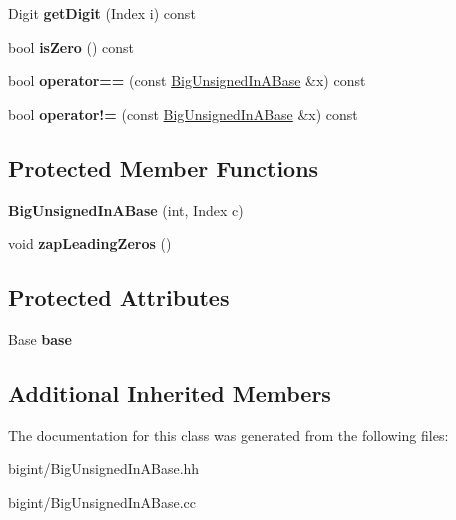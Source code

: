 \begin{DoxyCompactItemize}
Digit {\bfseries get\+Digit} (Index i) const
\item 
\mbox{\label{class_big_unsigned_in_a_base_a0333e61e3347ea7dd5a24a148d218ec5}} 
bool {\bfseries is\+Zero} () const
\item 
\mbox{\label{class_big_unsigned_in_a_base_ace96e86a0c91a3058132766ac6e7ffb2}} 
bool {\bfseries operator==} (const \mbox{\hyperlink{class_big_unsigned_in_a_base}{Big\+Unsigned\+In\+A\+Base}} \&x) const
\item 
\mbox{\label{class_big_unsigned_in_a_base_af217a437fb4e8b01ea54833397e12a6e}} 
bool {\bfseries operator!=} (const \mbox{\hyperlink{class_big_unsigned_in_a_base}{Big\+Unsigned\+In\+A\+Base}} \&x) const
\end{DoxyCompactItemize}
\subsection*{Protected Member Functions}
\begin{DoxyCompactItemize}
\item 
\mbox{\label{class_big_unsigned_in_a_base_a48d1d72385b3e74e11a3ba94ad71a154}} 
{\bfseries Big\+Unsigned\+In\+A\+Base} (int, Index c)
\item 
\mbox{\label{class_big_unsigned_in_a_base_a93d3365a8ce12915d186e086da351848}} 
void {\bfseries zap\+Leading\+Zeros} ()
\end{DoxyCompactItemize}
\subsection*{Protected Attributes}
\begin{DoxyCompactItemize}
\item 
\mbox{\label{class_big_unsigned_in_a_base_ae681463e5308aec2ff172e55fa881f0e}} 
Base {\bfseries base}
\end{DoxyCompactItemize}
\subsection*{Additional Inherited Members}


The documentation for this class was generated from the following files\+:\begin{DoxyCompactItemize}
\item 
bigint/Big\+Unsigned\+In\+A\+Base.\+hh\item 
bigint/Big\+Unsigned\+In\+A\+Base.\+cc\end{DoxyCompactItemize}
